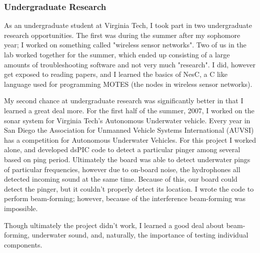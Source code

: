 \documentclass[12pt]{article}
\begin{document}
\subsubsection*{Undergraduate Research}
As an undergraduate student at Virginia Tech, I took part in two
undergraduate research opportunities. 
The first was during the summer after my sophomore year; 
I worked on something called "wireless sensor networks". 
Two of us in the lab worked together for the summer, which 
ended up consisting of a large amounts of troubleshooting
software and not very much "research". I did, however
get exposed to reading papers, and I learned the basics 
of NesC, a C like language used for programming MOTES (the
nodes in wireless sensor networks). 

My second chance at undergraduate research was significantly
better in that I learned a great deal more.
For the first half of the summer, 2007, I worked on the
sonar system for Virginia Tech's Autonomous Underwater vehicle.
Every year in San Diego the  
Association for Unmanned Vehicle Systems International (AUVSI)
has a competition for Autonomous Underwater Vehicles. For
this project I worked alone, and developed dsPIC code to detect
a particular pinger among several based on ping period.
Ultimately the board was able to detect underwater pings of 
particular frequencies, however due to on-board noise, the
hydrophones all detected incoming sound at the same time.
Because of this, our board could detect the pinger, 
but it couldn't properly detect its location. 
I wrote the code to perform beam-forming; however, because 
of the interference beam-forming was impossible. 

Though ultimately the project didn't work, I learned a good deal
about beam-forming, underwater sound, and, naturally, the importance
of testing individual components.
\end{document}
